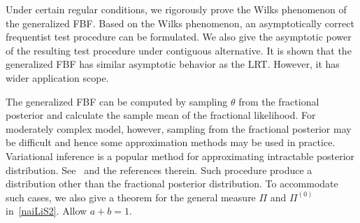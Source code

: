 \documentclass[11pt]{article}
\theoremstyle{plain}
\theoremstyle{definition}
\theoremstyle{remark}
\begin{document}
Under certain regular conditions, we rigorously prove the Wilks phenomenon of the generalized FBF.
Based on the Wilks phenomenon, an asymptotically correct frequentist test procedure can be formulated.
We also give the asymptotic power of the resulting test procedure under contiguous alternative.
It is shown that the generalized FBF has similar asymptotic behavior as the LRT.
{\color{red}However, it has wider application scope.}







The generalized FBF can be computed by sampling $\theta$ from the fractional posterior and calculate the sample mean of the fractional likelihood.
For moderately complex model, however, sampling from the fractional posterior may be difficult and hence some approximation methods may be used in practice.
Variational inference is a popular method for approximating intractable posterior distribution.
See~\cite{blei2017} and the references therein.
Such procedure produce a distribution other than the fractional posterior distribution.
To accommodate such cases, we also give a theorem for the general measure $\Pi$ and $\Pi^{(0)}$ in~\eqref{naiLiS2}.
{\color{red} Allow $a+b=1$.}
\end{document}
